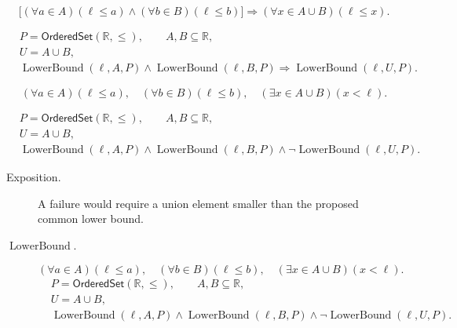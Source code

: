 \begin{remark*}
\[
\bigl[(\forall a\in A)(\ell\leq a)\land(\forall b\in B)(\ell\leq b)\bigr]
\Longrightarrow
(\forall x\in A\cup B)(\ell\leq x).
\]
\end{remark*}

\begin{remark*}
\[
\begin{aligned}
&P=\mathsf{OrderedSet}(\mathbb{R},\leq),\qquad A,B\subseteq\mathbb{R},\\
&U=A\cup B,\\
&\operatorname{LowerBound}(\ell,A,P)\land\operatorname{LowerBound}(\ell,B,P)
\Longrightarrow \operatorname{LowerBound}(\ell,U,P).
\end{aligned}
\]
\end{remark*}

\begin{remark*}
\[
(\forall a\in A)(\ell\leq a),\quad
(\forall b\in B)(\ell\leq b),\quad
(\exists x\in A\cup B)(x<\ell).
\]
\end{remark*}

\begin{remark*}
\[
\begin{aligned}
&P=\mathsf{OrderedSet}(\mathbb{R},\leq),\qquad A,B\subseteq\mathbb{R},\\
&U=A\cup B,\\
&\operatorname{LowerBound}(\ell,A,P)\land\operatorname{LowerBound}(\ell,B,P)\land
\neg\operatorname{LowerBound}(\ell,U,P).
\end{aligned}
\]
\end{remark*}

\begin{remark*}
\begin{description}
\item[Exposition.]
A failure would require a union element smaller than the proposed common
lower bound.


  \item[\(\operatorname{LowerBound}.\)]
  \[
(\forall a\in A)(\ell\leq a),\quad
(\forall b\in B)(\ell\leq b),\quad
(\exists x\in A\cup B)(x<\ell).
\]
\[
\begin{aligned}
&P=\mathsf{OrderedSet}(\mathbb{R},\leq),\qquad A,B\subseteq\mathbb{R},\\
&U=A\cup B,\\
&\operatorname{LowerBound}(\ell,A,P)\land\operatorname{LowerBound}(\ell,B,P)\land
\neg\operatorname{LowerBound}(\ell,U,P).
\end{aligned}
\]
\end{description}
\end{remark*}

